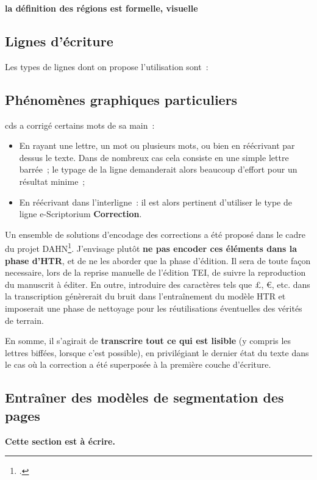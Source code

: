 \documentclass[a4paper,12pt,twoside]{book}
\begin{document}
				\textbf{la définition des régions est formelle, visuelle}
			
			\subsection{Lignes d'écriture}
				Les types de lignes dont on propose l'utilisation sont~:
						
			\subsection{Phénomènes graphiques particuliers}
				 \gls{cds} a corrigé certains mots de sa main~:
			
				\begin{itemize}
					\item En rayant une lettre, un mot ou plusieurs mots, ou bien en réécrivant par dessus le texte. Dans de nombreux cas cela consiste en une simple lettre barrée~; le typage de la ligne demanderait alors beaucoup d'effort pour un résultat minime~;
					\item En réécrivant dans l'interligne~: il est alors pertinent d'utiliser le type de ligne e-Scriptorium \textbf{Correction}.
				\end{itemize}
				
				Un ensemble de solutions d'encodage des corrections a été proposé dans le cadre du projet DAHN\footcite{chiffoleauFewTipsReading}. J'envisage plutôt \textbf{ne pas encoder ces éléments dans la phase d'HTR}, et de ne les aborder que la phase d'édition. Il sera de toute façon necessaire, lors de la reprise manuelle de l'édition TEI, de suivre la reproduction du manuscrit à éditer. En outre, introduire des caractères tels que £, €, etc. dans la transcription génèrerait du bruit dans l'entraînement du modèle HTR et imposerait une phase de nettoyage pour les réutilisations éventuelles des vérités de terrain.
				
				En somme, il s'agirait de \textbf{transcrire tout ce qui est lisible} (y compris les lettres biffées, lorsque c'est possible), en privilégiant le dernier état du texte dans le cas où la correction a été superposée à la première couche d'écriture.
		
			\subsection{Entraîner des modèles de segmentation des pages}
	    		\textbf{Cette section est à écrire.}
	    		
\end{document}
